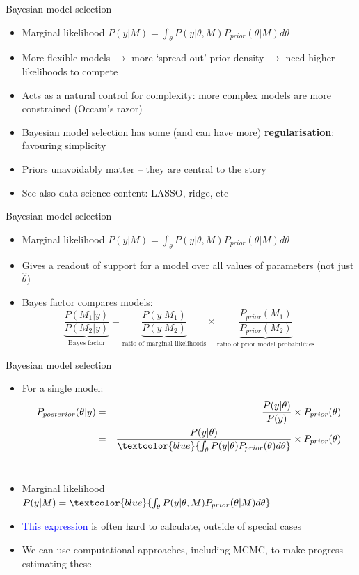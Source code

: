 \documentclass[10pt]{beamer}
\begin{document}
\begin{frame}{Bayesian model selection}
  \begin{itemize}
    \item Marginal likelihood $P(y|M) = \int_{\theta} P(y|\theta, M) P_{prior}(\theta|M) d\theta$
       \item More flexible models $\rightarrow$ more `spread-out' prior density $\rightarrow$ need higher likelihoods to compete
      \item Acts as a natural control for complexity: more complex models are more constrained (Occam's razor)
      \item Bayesian model selection has some (and can have more) \textbf{regularisation}: favouring simplicity
        \item Priors unavoidably matter -- they are central to the story
        \item See also data science content: LASSO, ridge, etc
  \end{itemize}
\end{frame}


\begin{frame}{Bayesian model selection}
  \begin{itemize}
    \item Marginal likelihood $P(y|M) = \int_{\theta} P(y|\theta, M) P_{prior}(\theta|M) d\theta$
    \item Gives a readout of support for a model over all values of parameters (not just $\hat{\theta}$)
    \item Bayes factor compares models:
      \begin{equation*}
        \underbrace{\frac{P(M_1 | y)}{P(M_2 | y)}}_{\text{Bayes factor}} = \underbrace{\frac{P(y|M_1)}{P(y|M_2)}}_{\text{ratio of marginal likelihoods}} \times \underbrace{\frac{P_{prior}(M_1)}{P_{prior}(M_2)}}_{\text{ratio of prior model probabilities}}
      \end{equation*}
  \end{itemize}
\end{frame}


\begin{frame}{Bayesian model selection}
  \begin{itemize}
  \item For a single model:
    \begin{eqnarray*}
      P_{posterior}(\theta|y) & = & \frac{P(y|\theta)}{P(y)} \times P_{prior}(\theta) \\
      & = & \frac{P(y|\theta)}{\textcolor{blue}{\int_{\theta} P(y|\theta) P_{prior}(\theta) d\theta}} \times P_{prior}(\theta)
      \end{eqnarray*} \\
    \item Marginal likelihood $P(y|M) = \textcolor{blue}{\int_{\theta} P(y|\theta, M) P_{prior}(\theta|M) d\theta}$
    \item \textcolor{blue}{This expression} is often hard to calculate, outside of special cases
      \item We can use computational approaches, including MCMC, to make progress estimating these
  \end{itemize}
\end{frame}
\end{document}
